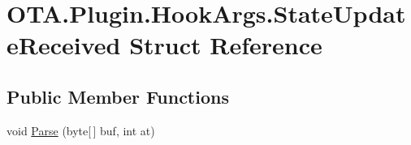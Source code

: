 \hypertarget{struct_o_t_a_1_1_plugin_1_1_hook_args_1_1_state_update_received}{}\section{O\+T\+A.\+Plugin.\+Hook\+Args.\+State\+Update\+Received Struct Reference}
\label{struct_o_t_a_1_1_plugin_1_1_hook_args_1_1_state_update_received}
\subsection*{Public Member Functions}
\begin{DoxyCompactItemize}
\item 
void \hyperlink{struct_o_t_a_1_1_plugin_1_1_hook_args_1_1_state_update_received_ae1f4626be035c8c5f209b2ec7ee64672}{Parse} (byte\mbox{[}$\,$\mbox{]} buf, int at)
\end{DoxyCompactItemize}
